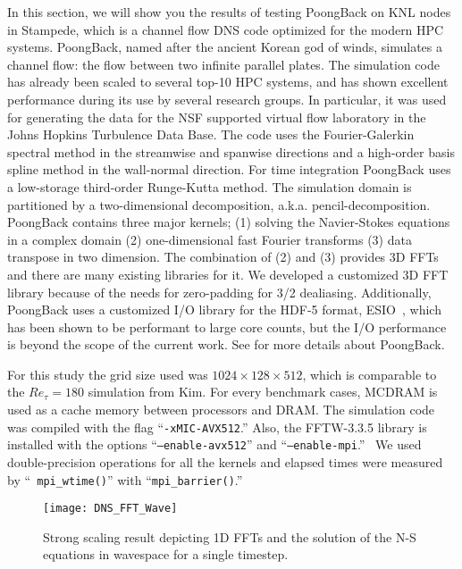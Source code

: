In this section, we will show you the results of testing PoongBack on
KNL nodes in Stampede, which is a channel flow DNS code optimized for
the modern HPC systems. PoongBack,
named after the ancient Korean god of winds, 
simulates a channel flow: the flow between two infinite 
parallel plates. The simulation code
has already been scaled to several top-10 HPC systems, and has 
shown excellent performance during its use by several research 
groups\cite{Lee:2013kv}. In particular, it was used for
generating the data for the NSF supported virtual flow laboratory in the 
Johns Hopkins Turbulence Data Base\cite{Graham:2015ha}.
The code uses the Fourier-Galerkin spectral method in the streamwise and spanwise directions 
and a high-order basis spline method in the wall-normal direction. 
For time integration PoongBack uses a low-storage
third-order Runge-Kutta method\cite{Spalart:1991wu}. 
The simulation domain is partitioned by
a two-dimensional decomposition, a.k.a. pencil-decomposition. PoongBack
contains three major kernels; (1) solving the Navier-Stokes equations in
a complex domain (2) one-dimensional fast Fourier transforms (3)
data transpose in two dimension. The combination of (2) and (3) provides 3D
FFTs and there are many existing libraries for it. We developed a customized 3D
FFT library because of the needs for zero-padding for 3/2
dealiasing. Additionally, PoongBack uses a customized I/O library for the HDF-5
format, ESIO~\cite{Lee:2014ta}, which has been shown to be performant to 
large core counts, but the I/O performance is beyond the scope of the current work. 
See \cite{Lee:2013kv,Lee:2014ta} for more details about PoongBack.  

For this study the grid size used was $1024\times128\times512$, which is 
comparable to the $Re_\tau = 180$ simulation from 
Kim\cite{Kim:1987ub}. For every benchmark cases, MCDRAM is
used as a cache memory between processors and DRAM. The simulation code
was compiled with the flag ``{\tt -xMIC-AVX512}.'' Also, the FFTW-3.3.5
library is installed with the options ``{\tt --enable-avx512}'' and
``{\tt --enable-mpi}.''~\cite{Frigo:2005tu} We used double-precision
operations for all the kernels and elapsed times were measured by ``{\tt
mpi\_wtime()}'' with ``{\tt mpi\_barrier()}.'' 

\begin{figure}
 \begin{center}
   \texttt{[image: DNS\_FFT\_Wave]}
   \caption{Strong scaling result depicting 1D FFTs and the solution of the 
  N-S equations in wavespace for a single timestep.}
   \label{fig:DNS_strong_scale_fft_wave}
 \end{center}
\end{figure}

